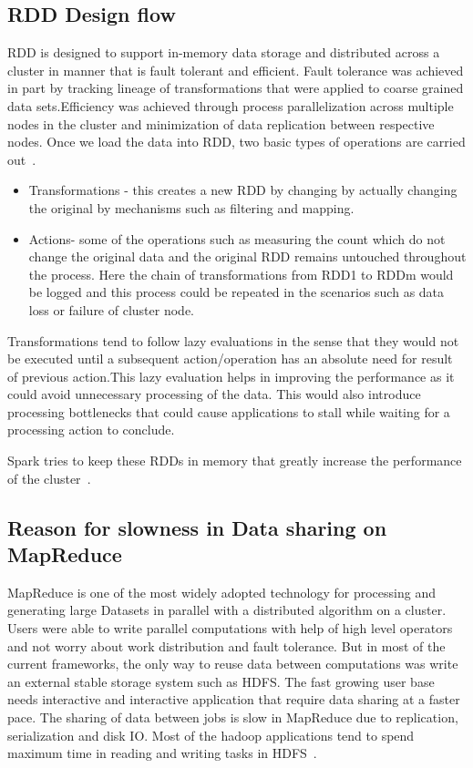 \subsection{RDD Design flow}

RDD is designed to support in-memory data storage and distributed across a 
cluster in manner that is   fault tolerant and efficient. Fault tolerance was 
achieved in part by tracking lineage of transformations that were applied to 
coarse grained data sets.Efficiency was achieved through process parallelization
 across multiple nodes in the cluster and minimization of data replication 
 between respective nodes.
Once we load the data into RDD, two basic types of operations are carried out~\cite{hid-sp18-410-spark-RDD}.

\begin{itemize}

\item Transformations - this creates a new RDD by changing by actually changing the 
original by mechanisms such as filtering and mapping.

\item Actions- some of the operations such as measuring the count which do not change 
the original data and the original RDD remains untouched throughout the process.
 Here the chain of transformations from RDD1 to RDDm would be logged and this 
 process could be repeated in the scenarios such as data loss or failure of 
 cluster node.

\end{itemize}

 Transformations tend to follow lazy evaluations in the sense that they would 
not be executed until a subsequent action/operation has an absolute need for 
result of previous action.This lazy evaluation helps in improving the 
performance as it could avoid unnecessary processing of the data. This would 
also introduce processing bottlenecks that could cause applications to stall 
while waiting for a processing action to conclude.

Spark tries to keep these RDDs in memory that greatly increase the performance 
of the cluster~\cite{hid-sp18-410-spark-RDD}.

\subsection{Reason for slowness in Data sharing on MapReduce}

MapReduce is one of the most widely adopted technology  for processing and 
generating large Datasets in parallel with a distributed algorithm on a cluster.
 Users were able to write parallel computations with help of high level 
 operators and not worry about work distribution and fault tolerance. But in 
 most of the current frameworks, the only way to reuse data between 
 computations was write an external stable storage system such as HDFS. 
The fast growing user base needs interactive and interactive application that 
require data sharing at a faster pace. The sharing of data between jobs is slow 
in MapReduce due to replication, serialization and disk IO. Most of the hadoop 
applications tend to spend maximum time in reading and writing tasks in HDFS~\cite{hid-sp18-410-spark-RDD}.

